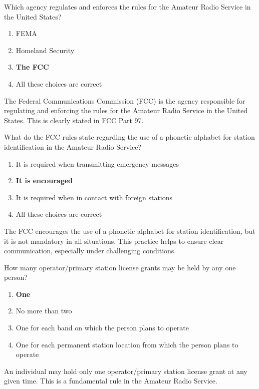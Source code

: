 
\begin{tcolorbox}[colback=gray!10!white,colframe=black!75!black,title={T1A02}]
    Which agency regulates and enforces the rules for the Amateur Radio Service in the United States?
    \begin{enumerate}[label=\Alph*),noitemsep]
        \item FEMA
        \item Homeland Security
        \item \textbf{The FCC}
        \item All these choices are correct
    \end{enumerate}
\end{tcolorbox}
The Federal Communications Commission (FCC) is the agency responsible for regulating and enforcing the rules for the Amateur Radio Service in the United States. This is clearly stated in FCC Part 97.


\begin{tcolorbox}[colback=gray!10!white,colframe=black!75!black,title={T1A03}]
    What do the FCC rules state regarding the use of a phonetic alphabet for station identification in the Amateur Radio Service?
    \begin{enumerate}[label=\Alph*),noitemsep]
        \item It is required when transmitting emergency messages
        \item \textbf{It is encouraged}
        \item It is required when in contact with foreign stations
        \item All these choices are correct
    \end{enumerate}
\end{tcolorbox}
The FCC encourages the use of a phonetic alphabet for station identification, but it is not mandatory in all situations. This practice helps to ensure clear communication, especially under challenging conditions.


\begin{tcolorbox}[colback=gray!10!white,colframe=black!75!black,title={T1A04}]
    How many operator/primary station license grants may be held by any one person?
    \begin{enumerate}[label=\Alph*),noitemsep]
        \item \textbf{One}
        \item No more than two
        \item One for each band on which the person plans to operate
        \item One for each permanent station location from which the person plans to operate
    \end{enumerate}
\end{tcolorbox}
An individual may hold only one operator/primary station license grant at any given time. This is a fundamental rule in the Amateur Radio Service.

